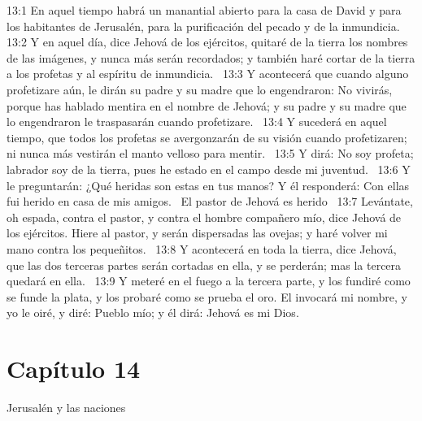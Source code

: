 13:1 En aquel tiempo habrá un manantial abierto para la casa de David y para los habitantes de Jerusalén, para la purificación del pecado y de la inmundicia.  
13:2 Y en aquel día, dice Jehová de los ejércitos, quitaré de la tierra los nombres de las imágenes, y nunca más serán recordados; y también haré cortar de la tierra a los profetas y al espíritu de inmundicia.  
13:3 Y acontecerá que cuando alguno profetizare aún, le dirán su padre y su madre que lo engendraron: No vivirás, porque has hablado mentira en el nombre de Jehová; y su padre y su madre que lo engendraron le traspasarán cuando profetizare.  
13:4 Y sucederá en aquel tiempo, que todos los profetas se avergonzarán de su visión cuando profetizaren; ni nunca más vestirán el manto velloso para mentir.  
13:5 Y dirá: No soy profeta; labrador soy de la tierra, pues he estado en el campo desde mi juventud.  
13:6 Y le preguntarán: ¿Qué heridas son estas en tus manos? Y él responderá: Con ellas fui herido en casa de mis amigos.  
El pastor de Jehová es herido  
13:7 Levántate, oh espada, contra el pastor, y contra el hombre compañero mío, dice Jehová de los ejércitos. Hiere al pastor, y serán dispersadas las ovejas; y haré volver mi mano contra los pequeñitos.  
13:8 Y acontecerá en toda la tierra, dice Jehová, que las dos terceras partes serán cortadas en ella, y se perderán; mas la tercera quedará en ella.  
13:9 Y meteré en el fuego a la tercera parte, y los fundiré como se funde la plata, y los probaré como se prueba el oro. El invocará mi nombre, y yo le oiré, y diré: Pueblo mío; y él dirá: Jehová es mi Dios.  
\section*{Capítulo 14 }
Jerusalén y las naciones  

